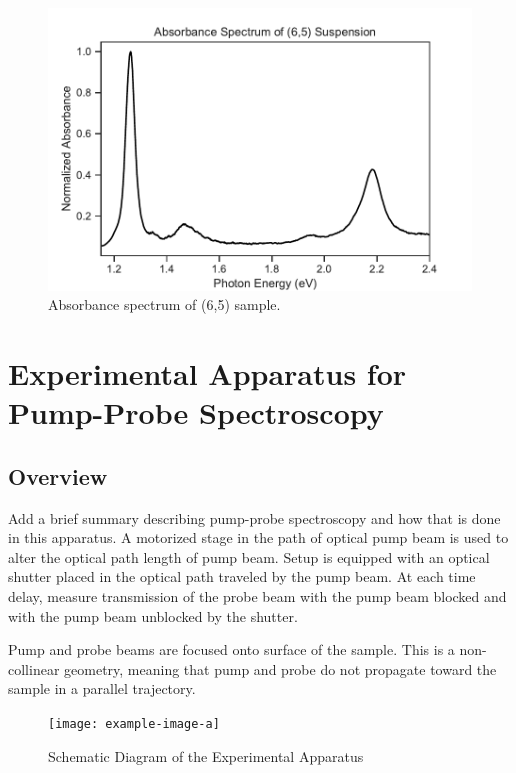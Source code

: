 \begin{figure}[H]
	\centering
	\includegraphics[scale=0.7]{images/chapter_methods/sample_absorbance}
	\caption{ Absorbance spectrum of (6,5) sample.}
	\label{fig:sample_absorbance}
\end{figure}

\section{Experimental Apparatus for Pump-Probe Spectroscopy}

\subsection{Overview}
{\color{red} Add a brief summary describing pump-probe spectroscopy and how that is done in this apparatus}.
A motorized stage in the path of optical pump beam is used to alter the optical path length of pump beam. 
Setup is equipped with an optical shutter placed in the optical path traveled by the pump beam. At each time delay, measure transmission of the probe beam with the pump beam blocked and with the pump beam unblocked by the shutter.  

Pump and probe beams are focused onto surface of the sample. This is a non-collinear geometry, meaning that pump and probe do not propagate toward the sample in a parallel trajectory. 

\begin{figure}[h]
	\centering
	\texttt{[image: example-image-a]}
	\caption{ Schematic Diagram of the Experimental Apparatus}
	\label{fig:setup_schematic}
\end{figure}


